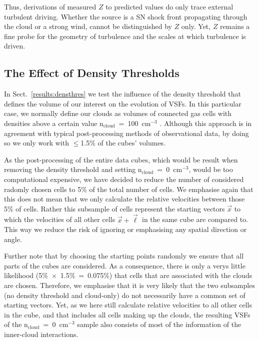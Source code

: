 Thus, derivations of measured $Z$ to predicted values do only trace external turbulent driving.
Whether the source is a SN shock front propagating through the cloud or a strong wind, cannot be distinguished by $Z$ only. 
Yet, $Z$ remains a fine probe for the geometry of turbulence and the scales at which turbulence is driven.


\subsection{The Effect of Density Thresholds}\label{discussion:densthres}

In Sect.~\ref{results:densthres} we test the influence of the density threshold that defines the volume of our interest on the evolution of VSFs.
In this particular case, we normally define our clouds as volumes of connected gas cells with densities above a certain value n$_\mathrm{cloud}$~=~100~cm$^{-3}$ . 
Although this approach is in agreement with typical post-processing methods of observational data, by doing so we only work with $\leq$1.5\% of the cubes' volumes.

As the post-processing of the entire data cubes, which would be result when removing the density threshold and setting n$_\mathrm{cloud}$~=~0~cm$^{-3}$, would be too computational expensive, we have decided to reduce the number of considered radomly chosen cells to 5\% of the total number of cells.
We emphasise again that this does not mean that we only calculate the relative velocities between those 5\% of cells.
Rather this subsample of cells represent the starting vectors $\vec{x}$ to which the velocities of all other cells  $\vec{x} + \vec{\ell}$ in the same cube are compared to.
This way we reduce the risk of ignoring or emphasising any spatial direction or angle.

Further note that by choosing the starting points randomly we ensure that all parts of the cubes are considered. 
As a consequence, there is only a verys little likelihood (5\%~$\times$~1.5\%~=~0.075\%) that cells that are associated with the clouds are chosen.
Therefore, we emphasise that it is very likely that the two subsamples (no density threshold and cloud-only) do not necessarily have a common set of starting vectors.
Yet, as we here still calculate relative velocities to all other cells in the cube, and that includes all cells making up the clouds, the resulting VSFs of the n$_\mathrm{cloud}$~=~0~cm$^{-3}$ sample also consists of most of the information of the inner-cloud interactions.

